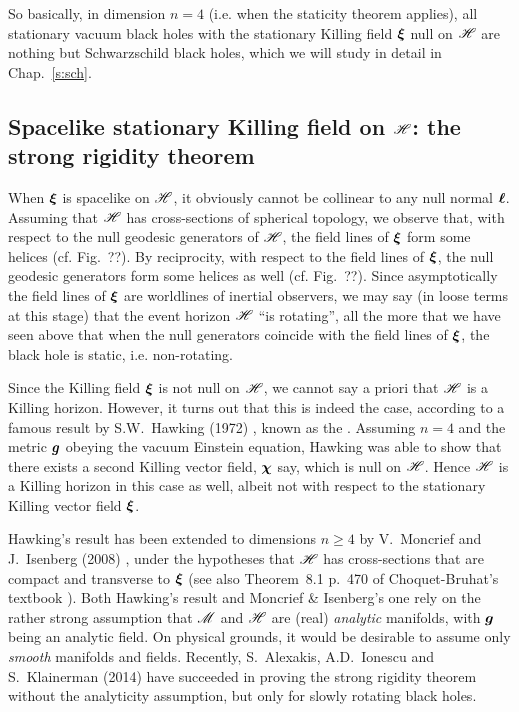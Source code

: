 So basically, in dimension $n=4$ (i.e. when the staticity theorem applies), all stationary vacuum black holes with the stationary Killing field $\bm{\xi}$ null
on $\mathscr{H}$ are nothing but Schwarzschild black holes, which we will study in detail in Chap.~\ref{s:sch}.


\subsection{Spacelike stationary Killing field on $\mathscr{H}$: the strong rigidity theorem}

When $\bm{\xi}$ is spacelike on $\mathscr{H}$, it obviously cannot be collinear to
any null normal $\bm{\ell}$.
Assuming that $\mathscr{H}$ has cross-sections of spherical topology, we observe
that, with respect to the null geodesic generators of $\mathscr{H}$, the field lines of $\bm{\xi}$
form some helices (cf. Fig.~??). By reciprocity, with respect to the field lines of $\bm{\xi}$,
the null geodesic generators form some helices as well (cf. Fig.~??).
Since asymptotically the field lines of $\bm{\xi}$ are worldlines of inertial observers,
we may say (in loose terms at this stage) that the event horizon $\mathscr{H}$
``is rotating'', all the more that we have seen above that when the null
generators coincide with the field lines of $\bm{\xi}$, the black hole is static, i.e. non-rotating.

Since the Killing field $\bm{\xi}$ is not null on $\mathscr{H}$, we cannot say a priori
that $\mathscr{H}$ is a Killing horizon. However, it turns out
that this is indeed the case, according to a famous result by S.W.~Hawking (1972)
\cite{Hawki72,HawkiE73}, known as the
.
Assuming $n=4$ and the metric $\bm{g}$ obeying the vacuum Einstein equation,
Hawking was able to show that there exists a second Killing vector field,
$\bm{\chi}$ say, which is null on $\mathscr{H}$. Hence $\mathscr{H}$ is a Killing horizon
in this case as well, albeit not with respect to the
stationary Killing vector field $\bm{\xi}$.

Hawking's result has been extended to dimensions $n\geq 4$ by V.~Moncrief
and J.~Isenberg (2008) \cite{MoncrI08}, under the hypotheses that $\mathscr{H}$
has cross-sections that are compact and transverse to $\bm{\xi}$ (see also
Theorem~8.1 p.~470 of Choquet-Bruhat's textbook \cite{Choqu09}).
Both Hawking's result
and Moncrief \& Isenberg's one rely on the rather strong assumption that $\mathscr{M}$ and $\mathscr{H}$
are (real) \emph{analytic} manifolds, with $\bm{g}$ being an analytic field. On physical grounds,
it would be desirable to assume only \emph{smooth} manifolds and fields.
Recently, S.~Alexakis, A.D.~Ionescu and S.~Klainerman \cite{AlexaIK14} (2014)
have succeeded in proving the strong rigidity theorem without the analyticity
assumption, but only for slowly rotating black holes.

